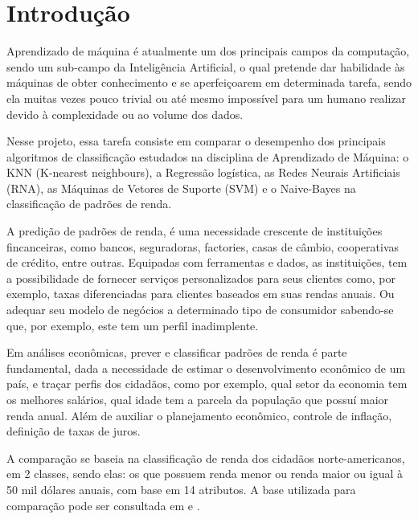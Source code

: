 \section{Introdução}
Aprendizado de máquina é atualmente um dos principais campos da computação, sendo um sub-campo da Inteligência Artificial, o qual pretende dar habilidade às máquinas de obter conhecimento e se aperfeiçoarem em determinada tarefa, sendo ela muitas vezes pouco trivial ou até mesmo impossível para um humano realizar devido à complexidade ou ao volume dos dados.

Nesse projeto, essa tarefa consiste em comparar o desempenho dos principais algoritmos de classificação estudados na disciplina de Aprendizado de Máquina: o KNN (K-nearest neighbours), a Regressão logística, as Redes Neurais Artificiais (RNA), as Máquinas de Vetores de Suporte (SVM) e o Naive-Bayes na classificação de padrões de renda. 
\cite{trabalho}

A predição de padrões de renda, é uma necessidade crescente de instituições fincanceiras, como bancos, seguradoras, factories, casas de câmbio, cooperativas de crédito, entre outras. Equipadas com ferramentas e dados, as instituições, tem a possibilidade de fornecer serviços personalizados para seus clientes como, por exemplo, taxas diferenciadas para clientes baseados em suas rendas anuais. Ou adequar seu modelo de negócios a determinado  tipo de consumidor sabendo-se que, por exemplo, este tem um perfil inadimplente.\cite{importance}

Em análises econômicas, prever e classificar padrões de renda é parte fundamental, dada a necessidade de estimar o desenvolvimento econômico de um país, e traçar perfis dos cidadãos, como por exemplo, qual setor da economia tem os melhores salários, qual idade tem a parcela da população que possuí maior renda anual. Além de auxiliar o planejamento econômico, controle de inflação, definição de taxas de juros.\cite{importance2}

A comparação se baseia na classificação de renda dos cidadãos norte-americanos, em 2 classes, sendo elas: os que possuem renda menor ou renda maior ou igual à 50 mil dólares anuais, com base em 14 atributos. A base utilizada para comparação pode ser consultada em \cite{base} e \cite{base2}.